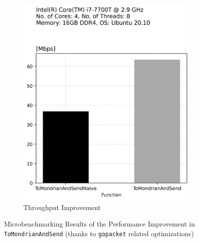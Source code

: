 \begin{figure}[t]
\begin{subfigure}[t]{.22\textwidth}
      \includegraphics[width=\linewidth]{img/to_mondrian_and_send_opt_throughput.png}
      \caption{Throughput Improvement}
      \label{fig:sub: Throughput Improvement}
    \end{subfigure}
    \caption{Microbenchmarking Results of the Performance Improvement in \texttt{ToMondrianAndSend} (thanks to \texttt{gopacket} related optimizations)}
    \label{fig:Performance Improvement in ToMondrianAndSend}
\end{figure}

